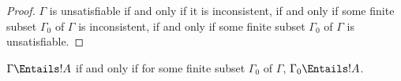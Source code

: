 \documentclass[../../../include/open-logic-section]{subfiles}
\begin{document}
\begin{proof}
$\Gamma$ is unsatisfiable if and only if it is inconsistent, if and
  only if some finite subset $\Gamma_0$ of $\Gamma$ is inconsistent,
  if and only if some finite subset $\Gamma_0$ of $\Gamma$ is
  unsatisfiable.
\end{proof}

\begin{cor}
$\Gamma \Entails !A$ if and only if for some finite subset
$\Gamma_0$ of $\Gamma$, $\Gamma_0 \Entails !A$.
\end{cor}
\end{document}
